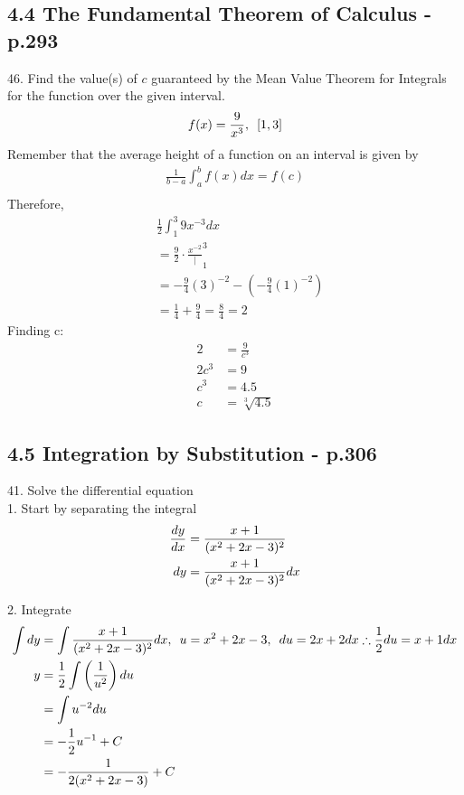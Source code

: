 \documentclass[11pt]{article}
\newcommand*{\set}{\setcounter{equation}{0}}
\newcommand*{\lt}{\left}
\newcommand*{\rt}{\right}
\begin{document}
\subsection{4.4 The Fundamental Theorem of Calculus - p.293}
46. Find the value(s) of $c$ guaranteed by the
Mean Value Theorem for Integrals for the function over the
given interval.
\begin{align}
    \set
    f(x)&=\frac{9}{x^3},\,\,\,[1, 3]\\
\end{align}
Remember that the average height of a function on an interval is given by
\begin{align}
    \frac{1}{b-a}\int_{a}^{b}f(x)dx=f(c)\\
\end{align} 
Therefore,
\begin{align}
    &\frac{1}{2}\int_{1}^{3}9x^{-3}dx\\
    &=\frac{9}{2}\cdot\frac{x^{-2}}|_1^3\\
    &=-\frac{9}{4}(3)^{-2}-\lt(-\frac{9}{4}(1)^{-2}\rt)\\
    &=\frac{1}{4}+\frac{9}{4}=\frac{8}{4}=2
\end{align}
Finding c:
\begin{align}
    2&=\frac{9}{c^3}\\
    2c^3&=9\\
    c^3&=4.5\\
    c&=\sqrt[3]{4.5}
\end{align}

\subsection{4.5 Integration by Substitution - p.306}
41. Solve the differential equation\\
1. Start by separating the integral
\begin{align}
    \set
    \frac{dy}{dx}&=\frac{x+1}{(x^2+2x-3)^2}\\
    dy&=\frac{x+1}{(x^2+2x-3)^2}dx\\
\end{align}

2. Integrate
\begin{align}
    \set
    \int dy&=\int \frac{x+1}{(x^2+2x-3)^2}dx,\,\,\, u=x^2+2x-3,\,\,\, du=2x+2dx\therefore \frac{1}{2}du=x+1dx\\
    y&=\frac{1}{2}\int\lt(\frac{1}{u^2}\rt)du\\
    &=\int u^{-2}du\\
    &=-\frac{1}{2}u^{-1}+C\\
    &=-\frac{1}{2(x^2+2x-3)}+C
\end{align}
\end{document}
